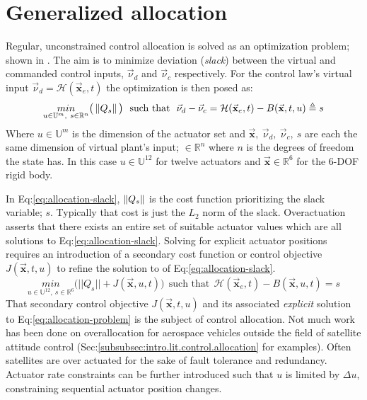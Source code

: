 \section{Generalized allocation}
\label{sec:allocation.slack}
Regular, unconstrained control allocation is solved as an optimization problem; shown in \cite{allocation,controlallocation}. The aim is to minimize deviation (\emph{slack}) between the virtual and commanded control inputs, $\vec{\nu}_d$ and $\vec{\nu}_c$ respectively. For the control law's virtual input $\vec{\nu}_d=\mathcal{H}(\vec{\mathbf{x}}_e,t)$ the optimization is then posed as:
\begin{equation}\label{eq:allocation-slack}
\underset{u\in\mathbb{U}^{m},~s\in\mathbb{R}^{n}}{min}\big(\left\lVert Q_s\right\rVert\big)~~\text{such that}~~\vec{\nu}_d-\vec{\nu}_c=\mathcal{H}(\vec{\mathbf{x}}_e,t)-B(\vec{\mathbf{x}},t,u)\triangleq s
\end{equation}
Where $u\in\mathbb{U}^m$ is the dimension of the actuator set and $\vec{\mathbf{x}},~\vec{\nu}_d,~\vec{\nu}_c,~s$ are each the same dimension of virtual plant's input; $\in\mathbb{R}^{n}$ where $n$ is the degrees of freedom the state has. In this case $u\in\mathbb{U}^{12}$ for twelve actuators and $\vec{\mathbf{x}}\in\mathbb{R}^6$ for the 6-DOF rigid body.
\par
In Eq:\ref{eq:allocation-slack}, $\left\lVert Q_s\right\rVert$ is the cost function prioritizing the slack variable; $s$. Typically that cost is just the $L_2$ norm of the slack. Overactuation asserts that there exists an entire set of suitable actuator values which are all solutions to Eq:\ref{eq:allocation-slack}. Solving for explicit actuator positions requires an introduction of a secondary cost function or control objective $J(\vec{\mathbf{x}},t,u)$ to refine the solution to of Eq:\ref{eq:allocation-slack}.
\begin{equation}\label{eq:allocation-problem}
\underset{u\in\mathbb{U}^{12},~s\in\mathbb{R}^{6}}{min}\big(||Q_s||+J(\vec{\mathbf{x}},u,t)\big)~~\text{such that}~~\mathcal{H}(\vec{\mathbf{x}}_e,t)-B(\vec{\mathbf{x}},u,t)=s
\end{equation}
That secondary control objective $J(\vec{\mathbf{x}},t,u)$ and its associated \emph{explicit} solution to Eq:\ref{eq:allocation-problem} is the subject of control allocation. Not much work has been done on overallocation for aerospace vehicles outside the field of satellite attitude control (Sec:\ref{subsubsec:intro.lit.control.allocation} for examples). Often satellites are over actuated for the sake of fault tolerance and redundancy\cite{FTCallocation,discreteFTC}. Actuator rate constraints can be further introduced such that $u$ is limited by $\Delta u$, constraining sequential actuator position changes.
